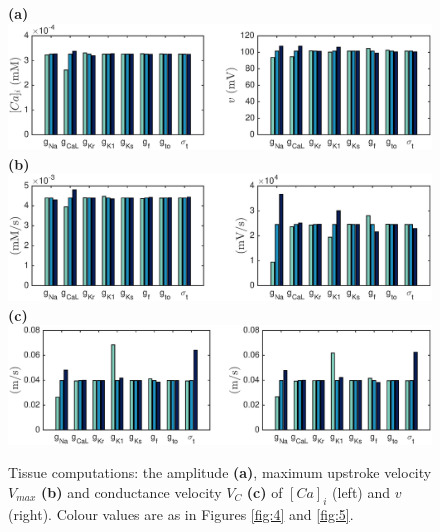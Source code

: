 \documentclass{article}
\begin{document}
\begin{figure}
 \textbf{(a)}  \includegraphics[trim=1cm 0cm 2cm 0cm, clip=true, width=1\linewidth]{amplitude} 
 \textbf{(b)}  \includegraphics[trim=1cm 0cm 2cm 0cm, clip=true, width=1\linewidth]{v_max} 
 \textbf{(c)}   \includegraphics[trim=1cm 0cm 2cm 0cm, clip=true, width=1\linewidth]{v_c} 
    \caption{Tissue computations: the amplitude \textbf{(a)}, maximum upstroke velocity $V_{max}$ \textbf{(b)} and conductance velocity $V_{C}$ \textbf{(c)} of $[Ca]_i$ (left) and $v$ (right).  Colour values are as in Figures \ref{fig:4} and \ref{fig:5}.}
    \label{fig:6}
\end{figure}
%
\end{document}
